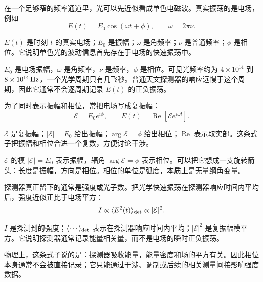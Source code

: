 在一个足够窄的频率通道里，光可以先近似看成单色电磁波。真实振荡的是电场，例如
\begin{equation}
  E(t)=E_0\cos(\omega t+\phi),
  \qquad \omega=2\pi\nu .
  \label{eq:monochromatic-field}
\end{equation}
\begin{formulaexplain}
\(E(t)\) 是时刻 \(t\) 的真实电场；\(E_0\) 是振幅；\(\omega\) 是角频率；\(\nu\) 是普通频率；\(\phi\) 是相位。它说明单色光的波动信息首先存在于电场的快速振荡中。
\end{formulaexplain}
\(E_0\) 是电场振幅，\(\omega\) 是角频率，\(\nu\) 是频率，\(\phi\) 是相位。可见光频率约为 \(4\times10^{14}\) 到 \(8\times10^{14}\,{\rm Hz}\)，一个光学周期只有几飞秒。普通天文探测器的响应远慢于这个周期，因此它通常不会逐周期记录 \(E(t)\) 的正负振荡。

为了同时表示振幅和相位，常把电场写成复振幅：
\begin{equation}
  \mathcal{E}=E_0e^{i\phi},
  \qquad
  E(t)=\operatorname{Re}\!\left[\mathcal{E}e^{i\omega t}\right].
  \label{eq:phasor-field}
\end{equation}
\begin{formulaexplain}
\(\mathcal E\) 是复振幅；\(|\mathcal E|=E_0\) 给出振幅；\(\arg\mathcal E=\phi\) 给出相位；\(\operatorname{Re}\) 表示取实部。这条式子把振幅和相位合进一个复数，方便讨论干涉。
\end{formulaexplain}
\(\mathcal E\) 的模 \(|\mathcal E|=E_0\) 表示振幅，辐角 \(\arg\mathcal E=\phi\) 表示相位。可以把它想成一支旋转箭头：长度是振幅，方向是相位。相位的单位是弧度，本质上是无量纲角变量。

探测器真正留下的通常是强度或光子数。把光学快速振荡在探测器响应时间内平均后，强度近似正比于电场平方：
\begin{equation}
  I\propto \langle E^2(t)\rangle_{\rm det}
  \propto |\mathcal{E}|^2 .
  \label{eq:intensity-from-field}
\end{equation}
\begin{formulaexplain}
\(I\) 是探测到的强度；\(\langle\cdots\rangle_{\rm det}\) 表示在探测器响应时间内平均；\(|\mathcal E|^2\) 是复振幅模平方。它说明探测器通常记录能量相关量，而不是电场的瞬时正负振荡。
\end{formulaexplain}
物理上，这条式子说的是：探测器吸收能量，能量密度和场的平方有关。因此相位本身通常不会被直接记录；它只能通过干涉、调制或后续的相关测量间接影响强度数据。


